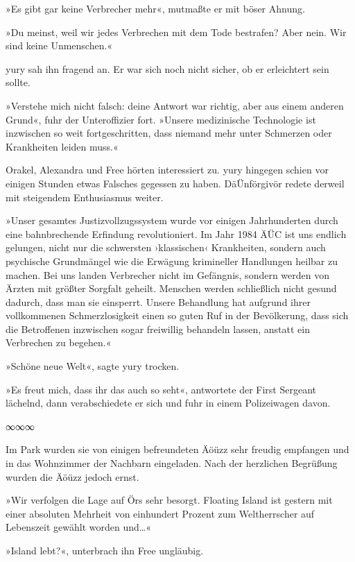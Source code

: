 »Es gibt gar keine Verbrecher mehr«, mutmaßte er mit böser Ahnung.

»Du meinst, weil wir jedes Verbrechen mit dem Tode bestrafen? Aber nein. Wir sind keine Unmenschen.«

yury sah ihn fragend an. Er war sich noch nicht sicher, ob er erleichtert sein sollte.

»Verstehe mich nicht falsch: deine Antwort war richtig, aber aus einem anderen Grund«, fuhr der Unteroffizier fort. »Unsere medizinische Technologie ist inzwischen so weit fortgeschritten, dass niemand mehr unter Schmerzen oder Krankheiten leiden muss.«

Orakel, Alexandra und Free hörten interessiert zu. yury hingegen schien vor einigen Stunden etwas Falsches gegessen zu haben. DäÜnförgivör redete derweil mit steigendem Enthusiasmus weiter.

»Unser gesamtes Justizvollzugssystem wurde vor einigen Jahrhunderten durch eine bahnbrechende Erfindung revolutioniert. Im Jahr 1984 ÄÜC ist uns endlich gelungen, nicht nur die schwersten ›klassischen‹ Krankheiten, sondern auch psychische Grundmängel wie die Erwägung krimineller Handlungen heilbar zu machen. Bei uns landen Verbrecher nicht im Gefängnis, sondern werden von Ärzten mit größter Sorgfalt geheilt. Menschen werden schließlich nicht gesund dadurch, dass man sie einsperrt. Unsere Behandlung hat aufgrund ihrer vollkommenen Schmerzlosigkeit einen so guten Ruf in der Bevölkerung, dass sich die Betroffenen inzwischen sogar freiwillig behandeln lassen, anstatt ein Verbrechen zu begehen.«

»Schöne neue Welt«, sagte yury trocken.

»Es freut mich, dass ihr das auch so seht«, antwortete der First Sergeant lächelnd, dann verabschiedete er sich und fuhr in einem Polizeiwagen davon.

\begin{center}
    ∞∞∞
\end{center}

Im Park wurden sie von einigen befreundeten Äöüzz sehr freudig empfangen und in das Wohnzimmer der Nachbarn eingeladen. Nach der herzlichen Begrüßung wurden die Äöüzz jedoch ernst.

»Wir verfolgen die Lage auf Örs sehr besorgt. Floating Island ist gestern mit einer absoluten Mehrheit von einhundert Prozent zum Weltherrscher auf Lebenszeit gewählt worden und…«

»Island lebt?«, unterbrach ihn Free ungläubig.

